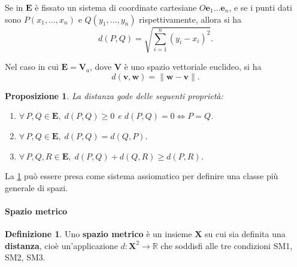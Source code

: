 \documentclass{article}
\theoremstyle{plain}
\newtheorem{prop}[thm]{Proposizione}
\theoremstyle{definition}
\newtheorem{defn}{Definizione}[section]
\theoremstyle{remark}
\begin{document}
\vspace{10pt}

Se in $\mathbf{E}$ è fissato un sistema di coordinate cartesiane $O\mathbf{e}_1 \ldots \mathbf{e}_n$, e se i punti dati sono 
$P(x_1, \ldots, x_n)$ e $Q(y_1, \ldots, y_n)$ rispettivamente, allora si ha
\[
d(P, Q) = \sqrt{\sum_{i=1}^{n}(y_i - x_i)^2}.
\]

\vspace{10pt}

Nel caso in cui $\mathbf{E} = \mathbf{V}_a$, dove $\mathbf{V}$ è uno spazio vettoriale euclideo, si ha
\[
d(\mathbf{v}, \mathbf{w}) = \|\mathbf{w} - \mathbf{v}\|.
\]

\vspace{10pt}

\begin{bxthm}
\begin{prop}\label{diciannovedue}
La distanza gode delle seguenti proprietà:
\begin{enumerate}
    \item[SM1] $\forall\,P, Q \in \mathbf{E},\; d(P, Q) \geq 0$ e $d(P, Q) = 0\iff P = Q$.
    \item[SM2] $\forall\,P, Q \in \mathbf{E},\;d(P, Q) = d(Q, P)$. 
    \item[SM3] $\forall\,P, Q, R \in \mathbf{E},\;d(P, Q) + d(Q, R) \geq d(P, R)$.
\end{enumerate}    
\end{prop}
\end{bxthm}

\vspace{10pt}

La \ref{diciannovedue} può essere presa come sistema assiomatico per definire una classe più generale di spazi.

\vspace{10pt}

\paragraph{Spazio metrico}
\begin{bxthm}
\begin{defn}
Uno \textbf{spazio metrico} è un insieme $\mathbf{X}$ su cui sia definita una \textbf{distanza}, cioè un'applicazione 
$d: \mathbf{X}^2 \to \mathbb{R}$ che soddisfi alle tre condizioni SM1, SM2, SM3.    
\end{defn}
\end{bxthm}

\vspace{10pt}
\end{document}
